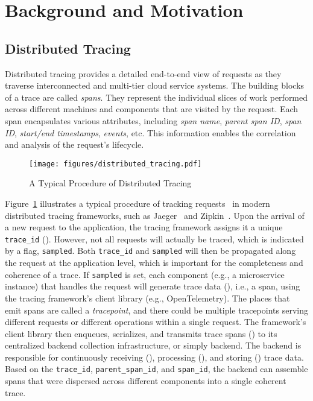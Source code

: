 \section{Background and Motivation}
\label{sec:background}

\subsection{Distributed Tracing}

Distributed tracing provides a detailed end-to-end view of requests as they traverse interconnected and multi-tier cloud service systems.
The building blocks of a trace are called \textit{spans}.
They represent the individual slices of work performed across different machines and components that are visited by the request.
Each span encapsulates various attributes, including \textit{span name}, \textit{parent span ID}, \textit{span ID}, \textit{start/end timestamps}, \textit{events}, etc.
This information enables the correlation and analysis of the request's lifecycle.

\begin{figure}
    \centering
    \texttt{[image: figures/distributed\_tracing.pdf]}
    \caption{A Typical Procedure of Distributed Tracing}
    \label{fig:distributed_tracing}
\end{figure}

Figure~\ref{fig:distributed_tracing} illustrates a typical procedure of tracking requests~\cite{DBLP:conf/nsdi/ZhangXAVM23,opentelemetry} in modern distributed tracing frameworks, such as Jaeger~\cite{jaeger} and Zipkin~\cite{zipkin}.
Upon the arrival of a new request to the application, the tracing framework assigns it a unique \texttt{trace\_id} ().
However, not all requests will actually be traced, which is indicated by a flag, \texttt{sampled}.
Both \texttt{trace\_id} and \texttt{sampled} will then be propagated along the request at the application level, which is important for the completeness and coherence of a trace.
If \texttt{sampled} is set, each component (e.g., a microservice instance) that handles the request will generate trace data (), i.e., a span, using the tracing framework's client library (e.g., OpenTelemetry).
The places that emit spans are called a \textit{tracepoint}, and there could be multiple tracepoints serving different requests or different operations within a single request.
The framework's client library then enqueues, serializes, and transmits trace spans () to its centralized backend collection infrastructure, or simply backend.
The backend is responsible for continuously receiving (), processing (), and storing () trace data.
Based on the \texttt{trace\_id}, \texttt{parent\_span\_id}, and \texttt{span\_id}, the backend can assemble spans that were dispersed across different components into a single coherent trace.

